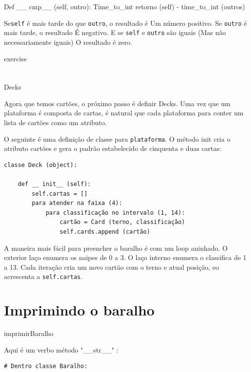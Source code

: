 \documentclass[10pt]{book}
\begin{document}
\begin{exercise}
\begin{v erbatim}
\begin{}
Def __ cmp__ (self, outro):
Time_to_int retorno (self) - time_to_int (outros)

Se{\tt self} é mais tarde do que {\tt outro}, o resultado é
Um número positivo. Se {\tt outro} é mais tarde, o resultado
É negativo. E se {\tt self} e {\tt outro} são iguais
(Mas não necessariamente iguais)
O resultado é zero.

\end{} exercise


\section{} Decks

Agora que temos cartões, o próximo passo é definir Decks. Uma vez que um
plataforma é composta de cartas, é natural que cada plataforma para conter um
lista de cartões como um atributo.

O seguinte é uma definição de classe para {\tt plataforma}. O
método init cria o atributo {cartões \tt} e gera
o padrão estabelecido de cinquenta e duas cartas:

\begin{verbatim}
classe Deck (object):

    def __ init__ (self):
        self.cartas = []
        para atender na faixa (4):
            para classificação no intervalo (1, 14):
                cartão = Card (terno, classificação)
                self.cards.append (cartão)
\end{verbatim}
%
A maneira mais fácil para preencher o baralho é com um loop aninhado. O exterior
laço enumera os naipes de 0 a 3. O laço interno enumera o
classifica de 1 a 13. Cada iteração
cria um novo cartão com o terno e atual posição,
eo acrescenta a {\tt self.cartas}.


\section{Imprimindo o baralho}
\label{} imprimirBaralho

Aqui é um verbo método "__str__" :

\begin{verbatim}
# Dentro classe Baralho:


\end{verbatim}
\end{v erbatim}
\end{exercise}
\end{document}
